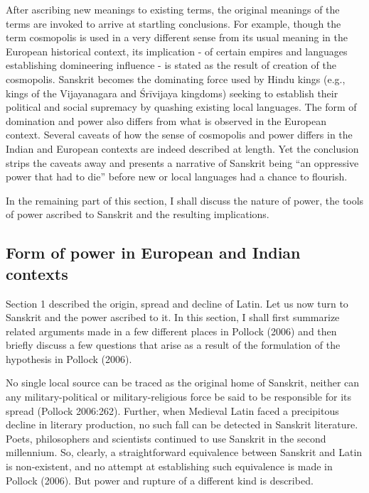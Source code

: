 After ascribing new meanings to existing terms, the original meanings of the terms are invoked to arrive at startling conclusions. For example, though the term cosmopolis is used in a very different sense from its usual meaning in the European historical context, its implication - of certain empires and languages establishing domineering influence - is stated as the result of creation of the cosmopolis. Sanskrit becomes the dominating force used by Hindu kings (e.g., kings of the Vijayanagara and Śrīvijaya kingdoms) seeking to establish their political and social supremacy by quashing existing local languages. The form of domination and power also differs from what is observed in the European context. Several caveats of how the sense of cosmopolis and power differs in the Indian and European contexts are indeed described at length. Yet the conclusion strips the caveats away and presents a narrative of Sanskrit being “an oppressive power that had to die” before new or local languages had a chance to flourish.

In the remaining part of this section, I shall discuss the nature of power, the tools of power ascribed to Sanskrit and the resulting implications.
\newpage


\subsection{Form of power in European and Indian contexts}
\vskip -4pt

Section 1 described the origin, spread and decline of Latin. Let us now turn to Sanskrit and the power ascribed to it. In this section, I shall first summarize related arguments made in a few different places in Pollock (2006) and then briefly discuss a few questions that arise as a result of the formulation of the hypothesis in Pollock (2006). 

No single local source can be traced as the original home of Sanskrit, neither can any military-political or military-religious force be said to be responsible for its spread (Pollock 2006:262). Further, when Medieval Latin faced a precipitous decline in literary production, no such fall can be detected in Sanskrit literature. Poets, philosophers and scientists continued to use Sanskrit in the second millennium. So, clearly, a straightforward equivalence between Sanskrit and Latin is non-existent, and no attempt at establishing such equivalence is made in Pollock (2006). But power and rupture of a different kind is described.

